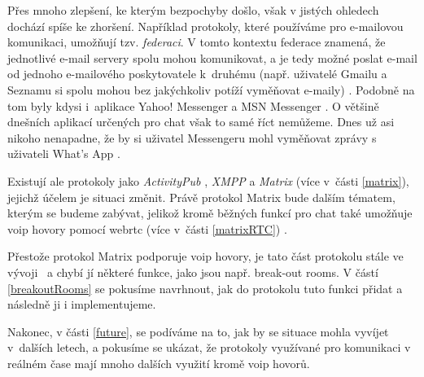 Přes mnoho zlepšení, ke kterým bezpochyby došlo, však v jistých ohledech dochází
spíše ke zhoršení. Například protokoly, které používáme pro e-mailovou
komunikaci, umožňují tzv. \textit{federaci}. V tomto kontextu federace znamená,
že jednotlivé e-mail servery spolu mohou komunikovat, a je tedy možné poslat
e-mail od jednoho e-mailového poskytovatele k~druhému (např. uživatelé Gmailu a
Seznamu si spolu mohou bez jakýchkoliv potíží vyměňovat e-maily)
\parencite{MatrixORG-FAQ}. Podobně na tom byly kdysi i~aplikace Yahoo! Messenger
a MSN Messenger \parencite{BetaNews-MSYahooToLinkIMNets}. O většině dnešních
aplikací určených pro chat však to samé říct nemůžeme. Dnes už asi nikoho
nenapadne, že by si uživatel Messengeru mohl vyměňovat zprávy s uživateli What's
App \parencite{9To5Mac-InteroperabilityNightmareAndDream}.

Existují ale protokoly jako \textit{ActivityPub} \parencite{W3ORG-ActivityPub},
\textit{XMPP} \parencite{XMPPORG-Homepage} a \textit{Matrix}
\parencite{MatrixORG-Homepage} (více v~části \ref{matrix}), jejichž účelem je
situaci změnit. Právě protokol Matrix bude dalším tématem, kterým se budeme
zabývat, jelikož kromě běžných funkcí pro chat také umožňuje \gls{voip} hovory
pomocí \gls{webrtc} (více v~části \ref{matrixRTC})
\parencite{MatrixORG-Homepage,MatrixORG-Spec}.

Přestože protokol Matrix podporuje \gls{voip} hovory, je tato část protokolu
stále ve vývoji~\parencite{GitHub-MSC3401,GitHub-MSC3898} a chybí jí některé
funkce, jako jsou např. break-out rooms. V částí \ref{breakoutRooms} se pokusíme
navrhnout, jak do protokolu tuto funkci přidat a následně ji i implementujeme.

Nakonec, v části \ref{future}, se podíváme na to, jak by se situace mohla
vyvíjet v~dalších letech, a pokusíme se ukázat, že protokoly využívané pro
komunikaci v reálném čase mají mnoho dalších využití kromě \gls{voip} hovorů.
